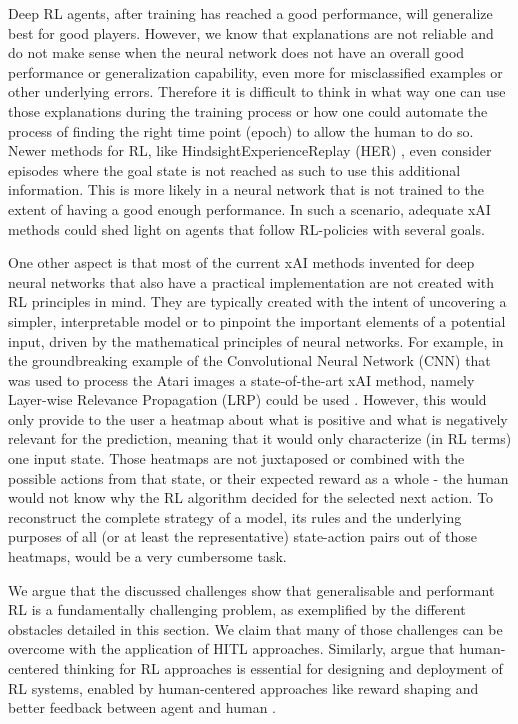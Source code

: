 \documentclass[twoside,11pt]{article}
\begin{document}
Deep RL agents, after training has reached a good performance, will generalize best for good players. However, we know that explanations are not reliable and do not make sense when the neural network does not have an overall good performance or generalization capability, even more for misclassified examples or other underlying errors. Therefore it is difficult to think in what way one can use those explanations during the training process or how one could automate the process of finding the right time point (epoch) to allow the human to do so. Newer methods for RL, like HindsightExperienceReplay (HER) \citep{Andrychowicz:2017:HERHindsightExperienceReplay}, even consider episodes where the goal state is not reached as such to use this additional information. This is more likely in a neural network that is not trained to the extent of having a good enough performance. In such a scenario, adequate xAI methods could shed light on agents that follow RL-policies with several goals. 

One other aspect is that most of the current xAI methods invented for deep neural networks that also have a practical implementation are not created with RL principles in mind. They are typically created with the intent of uncovering a simpler, interpretable model or to pinpoint the important elements of a potential input, driven by the mathematical principles of neural networks. For example, in the groundbreaking example of the Convolutional Neural Network (CNN) that was used to process the Atari images \citep{Mnih:2013:PlayingAtariDeepRL} a state-of-the-art xAI method, namely Layer-wise Relevance Propagation (LRP) could be used \citep{Bach:2015:LayerWiseRelevancePropagation,Alber:2019:Innvestigate}. However, this would only provide to the user a heatmap about what is positive and what is negatively relevant for the prediction, meaning that it would only characterize (in RL terms) one input state. Those heatmaps are not juxtaposed or combined with the possible actions from that state, or their expected reward as a whole - the human would not know why the RL algorithm decided for the selected next action. To reconstruct the complete strategy of a model, its rules and the underlying purposes of all (or at least the representative) state-action pairs out of those heatmaps, would be a very cumbersome task. 

We argue that the discussed challenges show that generalisable and performant RL is a fundamentally challenging problem, as exemplified by the different obstacles detailed in this section. We claim that many of those challenges can be overcome with the application of HITL approaches. Similarly, \citet{MatthewsonPilarski:2022:DesigningAndEvaluatingHCIML} argue that human-centered thinking for RL approaches is essential for designing and deployment of RL systems, enabled by human-centered approaches like reward shaping and better feedback between agent and human \citep{Li:2019:HumanCenteredRLSurvey}. 
\end{document}
